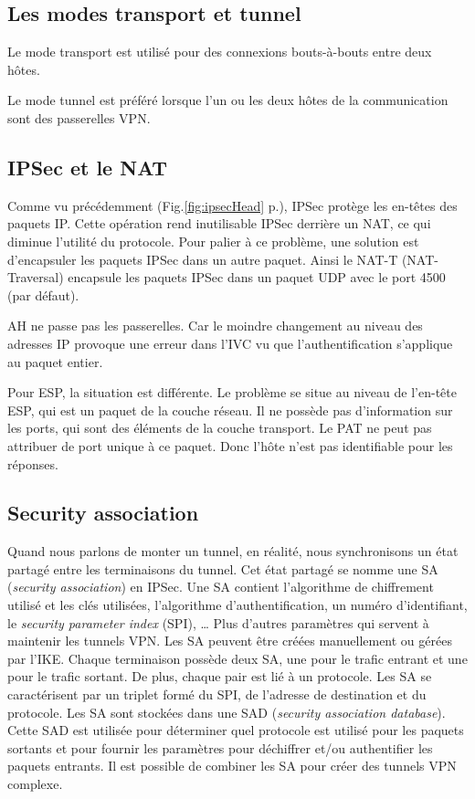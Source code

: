 \subsection{Les modes transport et tunnel}
Le mode transport est utilisé pour des connexions bouts-à-bouts entre deux hôtes.

Le mode tunnel est préféré lorsque l'un ou les deux hôtes de la communication sont des passerelles VPN.

\subsection{IPSec et le NAT}
Comme vu précédemment (Fig.\ref{fig:ipsecHead} p.\pageref{fig:ipsecHead}), IPSec protège les en-têtes des paquets IP.
Cette opération rend inutilisable IPSec derrière un NAT, ce qui diminue l'utilité du protocole.
Pour palier à ce problème, une solution est d'encapsuler les paquets IPSec dans un autre paquet.
Ainsi le NAT-T (NAT-Traversal) encapsule les paquets IPSec dans un paquet UDP avec le port 4500 (par défaut).

AH ne passe pas les passerelles. 
Car le moindre changement au niveau des adresses IP provoque une erreur dans l'IVC vu que l'authentification s'applique au paquet entier.

Pour ESP, la situation est différente. 
Le problème se situe au niveau de l'en-tête ESP, qui est un paquet de la couche réseau.
Il ne possède pas d'information sur les ports, qui sont des éléments de la couche transport.
Le PAT ne peut pas attribuer de port unique à ce paquet.
Donc l'hôte n'est pas identifiable pour les réponses.

\subsection{Security association}
Quand nous parlons de monter un tunnel, en réalité, nous synchronisons un état partagé entre les terminaisons du tunnel. 
Cet état partagé se nomme une SA (\textit{security association}) en IPSec. 
Une SA contient l'algorithme de chiffrement utilisé et les clés utilisées, l'algorithme d'authentification, un numéro d'identifiant, le \textit{security parameter index} (SPI), … 
Plus d'autres paramètres qui servent à maintenir les tunnels VPN. 
Les SA peuvent être créées manuellement ou gérées par l'IKE. 
Chaque terminaison possède deux SA, une pour le trafic entrant et une pour le trafic sortant. 
De plus, chaque pair est lié à un protocole. 
Les SA se caractérisent par un triplet formé du SPI, de l'adresse de destination et du protocole. 
Les SA sont stockées dans une SAD (\textit{security association database}). 
Cette SAD est utilisée pour déterminer quel protocole est utilisé pour les paquets sortants et pour fournir les paramètres pour déchiffrer et/ou authentifier les paquets entrants. 
Il est possible de combiner les SA pour créer des tunnels VPN complexe. 

